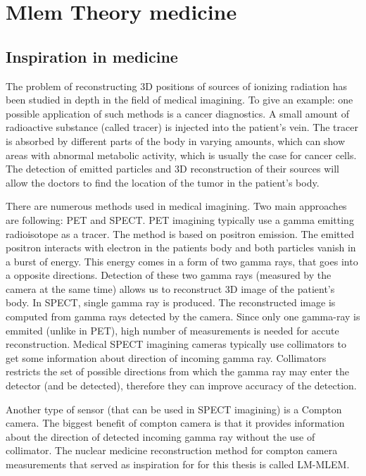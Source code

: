 
\chapter{Mlem Theory medicine}

\section{Inspiration in medicine}
The problem of reconstructing 3D positions of sources of ionizing radiation has been studied in depth in the field of medical imagining.
To give an example: one possible application of such methods is a cancer diagnostics.
A small amount of radioactive substance (called tracer) is injected into the patient's vein.
The tracer is absorbed by different parts of the body in varying amounts, which can show areas with abnormal metabolic activity, which is usually the case for cancer cells.
The detection of emitted particles and 3D reconstruction of their sources will allow the doctors to find the location of the tumor in the patient's body.

There are numerous methods used in medical imagining. 
Two main approaches are following: \ac{PET} and \ac{SPECT}.
\ac{PET} imagining typically use a gamma emitting radioisotope as a tracer.  
The method is based on positron emission. 
The emitted positron interacts with electron in the patients body and both particles vanish in a burst of energy. 
This energy comes in a form of two gamma rays, that goes into a opposite directions.
Detection of these two gamma rays (measured by the camera at the same time) allows us to reconstruct 3D image of the patient's body.
In \ac{SPECT}, single gamma ray is produced. 
The reconstructed image is computed from gamma rays detected by the camera.
Since only one gamma-ray is emmited (unlike in \ac{PET}), high number of measurements is needed for accute reconstruction.
Medical \ac{SPECT} imagining cameras typically use collimators to get some information about direction of incoming gamma ray.
Collimators restricts the set of possible directions from which the gamma ray may enter the detector (and be detected), therefore they can improve accuracy of the detection.

Another type of sensor (that can be used in \ac{SPECT} imagining) is a Compton camera.
The biggest benefit of compton camera is that it provides information about the direction of detected incoming gamma ray without the use of collimator.
The nuclear medicine reconstruction method for compton camera measurements that served as inspiration for for this thesis is called \ac{LM-MLEM}.

